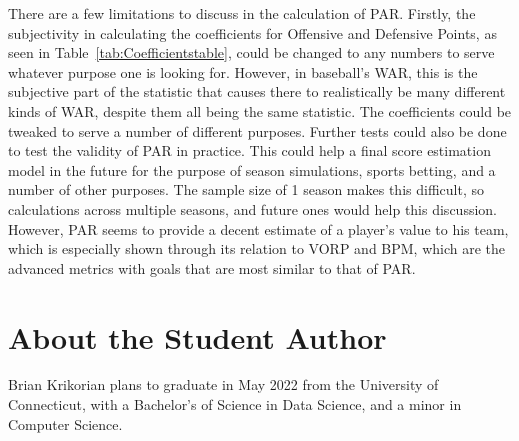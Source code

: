 \documentclass[12pt]{article}
\begin{document}
There are a few limitations to discuss in the calculation of PAR. Firstly, the 
subjectivity in calculating the coefficients for Offensive and Defensive 
Points, as seen in Table~\ref{tab:Coefficientstable}, could be changed to 
any numbers to serve whatever purpose one is looking for. However, in 
baseball's WAR, this is the subjective part of the statistic that causes 
there to realistically be many different kinds of WAR, despite them all 
being the same statistic. The coefficients could be tweaked to serve a 
number of different purposes. Further tests could also be done to test the 
validity of PAR in practice. This could help a final score estimation model 
in the future for the purpose of season simulations, sports betting, and a 
number of other purposes. The sample size of 1 season makes this 
difficult, so calculations across multiple seasons, and future ones would 
help this discussion. However, PAR seems to provide a decent estimate of 
a player's value to his team, which is especially shown through its relation 
to VORP and BPM, which are the advanced metrics with goals that are 
most similar to that of PAR.










\section*{About the Student Author}
Brian Krikorian plans to graduate in May 2022 from the University of 
Connecticut, with a Bachelor's of Science in Data Science, and a minor in 
Computer Science.


\end{document}
